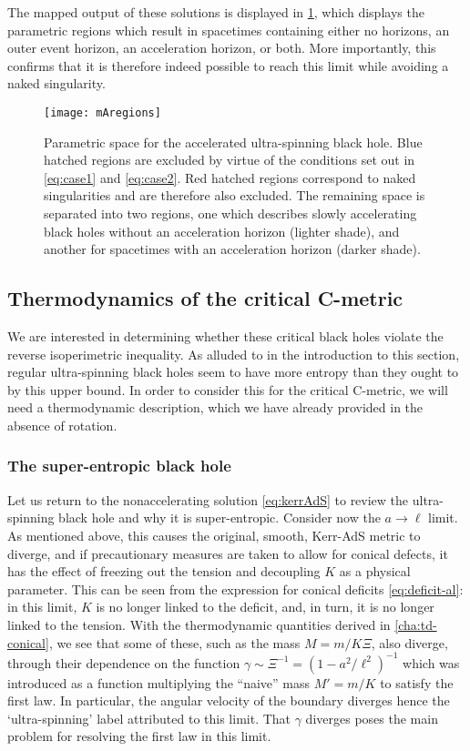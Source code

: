 \documentclass[
twoside,
openright,
frontopenright,
]{dmathesis}
\begin{document}
The mapped output of these solutions is displayed in \cref{fig:horroots}, which
displays the parametric regions which result in spacetimes containing either no
horizons, an outer event horizon, an acceleration horizon, or both. More
importantly, this confirms that it is therefore indeed possible to reach this
limit while avoiding a naked singularity.
 
\begin{figure}
  \centering
  \texttt{[image: mAregions]}
  \caption{\label{fig:horroots}Parametric space for the accelerated ultra-spinning
    black hole. Blue hatched regions are excluded by virtue of the conditions set
    out in \cref{eq:case1} and \cref{eq:case2}. Red hatched regions correspond to
    naked singularities and are therefore also excluded. The remaining space is
    separated into two regions, one which describes slowly accelerating black holes
    without an acceleration horizon (lighter shade), and another for spacetimes with
    an acceleration horizon (darker shade).}
\end{figure}

\subsection{Thermodynamics of the critical C-metric}

We are interested in determining whether these critical black holes violate the
reverse isoperimetric inequality.  As alluded to in the introduction to this section,
regular ultra-spinning black holes seem to have more entropy than they ought to
by this upper bound. In order to consider this for the critical C-metric, we
will need a thermodynamic description, which we have already provided in the
absence of rotation.

\subsubsection{The super-entropic black hole}
\label{sec:uskerr}

Let us return to the nonaccelerating solution \eqref{eq:kerrAdS} to review the
ultra-spinning black hole and why it is super-entropic. Consider now the
$a\to\ell$ limit. As mentioned above, this causes the original, smooth, Kerr-AdS
metric to diverge, and if precautionary measures are taken to allow for conical
defects, it has the effect of freezing out the tension and decoupling $K$ as a
physical parameter. This can be seen from the expression for conical deficits
\eqref{eq:deficit-al}: in this limit, $K$ is no longer linked to the deficit,
and, in turn, it is no longer linked to the tension. With the thermodynamic
quantities derived in \cref{cha:td-conical}, we see that some of these, such as
the mass $M=m/K \Xi$, also diverge, through their dependence on the function
$\gamma\sim \Xi^{-1} = (1-a^2/\ell^2)^{-1}$ which was introduced as a function
multiplying the ``naive'' mass $M' = m/K$ to satisfy the first law. In
particular, the angular velocity of the boundary diverges hence the
`ultra-spinning' label attributed to this limit. That $\gamma$ diverges poses
the main problem for resolving the first law in this limit.
\end{document}
